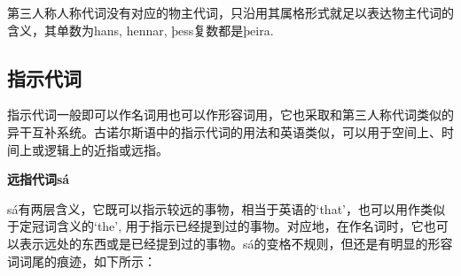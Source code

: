 第三人称人称代词没有对应的物主代词，只沿用其属格形式就足以表达物主代词的含义，其单数为hans,
hennar, þess复数都是þeira.

\subsection{指示代词}\label{指示代词}

指示代词一般即可以作名词用也可以作形容词用，它也采取和第三人称代词类似的异干互补系统。古诺尔斯语中的指示代词的用法和英语类似，可以用于空间上、时间上或逻辑上的近指或远指。

\textbf{远指代词sá}

sá有两层含义，它既可以指示较远的事物，相当于英语的`that‌'，也可以用作类似于定冠词含义的`the‌',
用于指示已经提到过的事物。对应地，在作名词时，它也可以表示远处的东西或是已经提到过的事物。sá的变格不规则，但还是有明显的形容词词尾的痕迹，如下所示：

